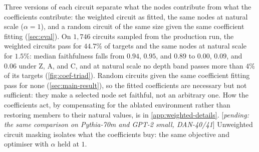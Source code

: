 \documentclass[10pt]{article}
\newcommand{\pending}[1]{\textcolor{red!70!black}{[\textit{pending: #1}]}}
\begin{document}
Three versions of each circuit separate what the nodes contribute from what the coefficients contribute: the weighted circuit as fitted, the same nodes at natural scale ($\alpha = 1$), and a random circuit of the same size given the same coefficient fitting (\cref{sec:eval}).
On $1{,}746$ circuits sampled from the production run, the weighted circuits pass for $44.7\%$ of targets and the same nodes at natural scale for $1.5\%$: median faithfulness falls from $0.94$, $0.95$, and $0.89$ to $0.00$, $0.09$, and $0.06$ under Z, A, and C, and at natural scale no depth band passes more than $4\%$ of its targets (\cref{fig:coef-triad}).
Random circuits given the same coefficient fitting pass for none (\cref{sec:main-result}), so the fitted coefficients are necessary but not sufficient: they make a selected node set faithful, not an arbitrary one.
How the coefficients act, by compensating for the ablated environment rather than restoring members to their natural values, is in \cref{app:weighted-details}.
\pending{the same comparison on Pythia-70m and GPT-2 small, DAN-40/41}
Unweighted circuit masking isolates what the coefficients buy: the same objective and optimiser with $\alpha$ held at $1$.
\end{document}
